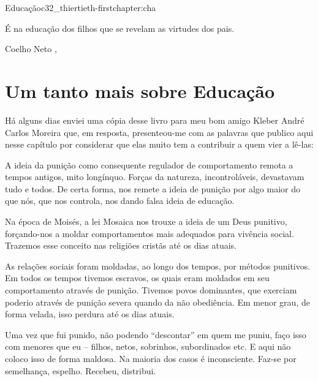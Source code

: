 \begin{chapterpage}{Educação}{c32_thiertieth-firstchapter:cha}

\begin{myquotation}É na educação dos filhos que se revelam as virtudes dos pais.

\par\vspace*{15mm}
\mbox{}\hfill \emdash{}Coelho Neto 
, %
\par\end{myquotation}

\end{chapterpage}



\section{Um tanto mais sobre Educação}\label{c1_basicformatting:sec}

\emdash{}Há alguns dias enviei uma cópia desse livro para meu bom  amigo Kleber André Carlos Moreira que, em resposta, presenteou-me com as palavras que publico aqui nesse capítulo por considerar que elas muito tem a contribuir a quem vier a lê-las:

\emdash{}A ideia da punição como consequente regulador de comportamento remota a tempos antigos, mito longínquo. Forças da natureza, incontroláveis, devastavam tudo e todos. De certa forma, nos remete a ideia de punição por algo maior do que nós, que nos controla, nos dando falsa ideia de educação.

\emdash{}Na época de Moisés, a lei Mosaica nos trouxe a ideia de um Deus punitivo, forçando-nos a moldar comportamentos mais adequados para vivência social. Trazemos esse conceito nas religiões cristãs até os dias atuais.

\emdash{}As relações sociais foram moldadas, ao longo dos tempos, por métodos punitivos. Em todos os tempos tivemos escravos, os quais eram moldados em seu comportamento através de punição. Tivemos povos dominantes, que exerciam poderio através de punição severa quando da não obediência. Em menor grau, de forma velada, isso perdura até os dias atuais.

\emdash{}Uma vez que fui punido, não podendo ``descontar” em quem me puniu, faço isso com menores que eu – filhos, netos, sobrinhos, subordinados etc. E aqui não coloco isso de forma maldosa. Na maioria dos casos é inconsciente. Faz-se por semelhança, espelho. Recebeu, distribui.

